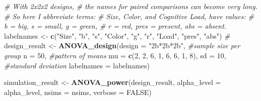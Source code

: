 \documentclass[
]{book}
\newenvironment{Shaded}{\begin{snugshade}}{\end{snugshade}}
\newcommand{\CommentTok}[1]{\textcolor[rgb]{0.56,0.35,0.01}{\textit{#1}}}
\newcommand{\DataTypeTok}[1]{\textcolor[rgb]{0.13,0.29,0.53}{#1}}
\newcommand{\DecValTok}[1]{\textcolor[rgb]{0.00,0.00,0.81}{#1}}
\newcommand{\KeywordTok}[1]{\textcolor[rgb]{0.13,0.29,0.53}{\textbf{#1}}}
\newcommand{\NormalTok}[1]{#1}
\newcommand{\OtherTok}[1]{\textcolor[rgb]{0.56,0.35,0.01}{#1}}
\newcommand{\StringTok}[1]{\textcolor[rgb]{0.31,0.60,0.02}{#1}}
\begin{document}
\begin{Shaded}
\begin{Highlighting}[]
\CommentTok{# With 2x2x2 designs, }
\CommentTok{# the names for paired comparisons can become very long. }
\CommentTok{# So here I abbreviate terms: }
\CommentTok{#   Size, Color, and Cognitive Load, have values:}
\CommentTok{# b = big, s = small, g = green, }
\CommentTok{# r = red, pres = present, abs = absent.  }
\NormalTok{labelnames <-}\StringTok{ }\KeywordTok{c}\NormalTok{(}\StringTok{"Size"}\NormalTok{, }\StringTok{"b"}\NormalTok{, }\StringTok{"s"}\NormalTok{, }\StringTok{"Color"}\NormalTok{, }\StringTok{"g"}\NormalTok{, }\StringTok{"r"}\NormalTok{, }
                \StringTok{"Load"}\NormalTok{, }\StringTok{"pres"}\NormalTok{, }\StringTok{"abs"}\NormalTok{) }\CommentTok{#}
\NormalTok{design_result <-}\StringTok{ }\KeywordTok{ANOVA_design}\NormalTok{(}\DataTypeTok{design =} \StringTok{"2b*2b*2b"}\NormalTok{, }
                              \CommentTok{#sample size per group }
                              \DataTypeTok{n =} \DecValTok{50}\NormalTok{, }
                              \CommentTok{#pattern of means}
                              \DataTypeTok{mu =} \KeywordTok{c}\NormalTok{(}\DecValTok{2}\NormalTok{, }\DecValTok{2}\NormalTok{, }\DecValTok{6}\NormalTok{, }\DecValTok{1}\NormalTok{, }\DecValTok{6}\NormalTok{, }\DecValTok{6}\NormalTok{, }\DecValTok{1}\NormalTok{, }\DecValTok{8}\NormalTok{), }
                              \DataTypeTok{sd =} \DecValTok{10}\NormalTok{, }\CommentTok{#standard deviation}
                              \DataTypeTok{labelnames =}\NormalTok{ labelnames) }
\end{Highlighting}
\end{Shaded}

\begin{Shaded}
\begin{Highlighting}[]
\NormalTok{simulation_result <-}\StringTok{ }\KeywordTok{ANOVA_power}\NormalTok{(design_result, }
                                 \DataTypeTok{alpha_level =}\NormalTok{ alpha_level, }
                                 \DataTypeTok{nsims =}\NormalTok{ nsims,}
                                 \DataTypeTok{verbose =} \OtherTok{FALSE}\NormalTok{)}
\end{Highlighting}
\end{Shaded}
\end{document}
